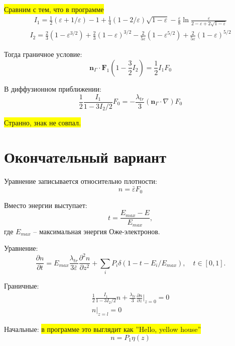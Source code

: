 \documentclass[a4paper,12pt]{article} %
\newcommand{\dff}[2]{\frac{\partial #1}{\partial #2}}
\newcommand{\dfn}[3]{\frac{\partial^#1 #2}{\partial #3^#1}}
\renewcommand{\vec}[1]{\bm{#1}}
\newcommand{\eps}{\varepsilon}
\begin{document}
\colorbox{yellow}{Сравним с тем, что в программе}
\begin{gather*}
I_1 =
\frac{1}{2} (\eps + 1/\eps) - 1 +
\frac{1}{4} (1 - 2/\eps)\sqrt{1 - \eps} -
\frac{\eps}{8} \ln \frac{\eps}{2 - \eps + 2 \sqrt{1 - \eps}}
\end{gather*}
\begin{gather*}
I_2 =
\frac{2}{3} (1 -\eps^{3/2})
+ \frac{2}{3} (1 -\eps)^{3/2}
- \frac{2}{5 \eps} (1 -\eps^{5/2})
+ \frac{2}{5 \eps} (1 -\eps)^{5/2}
\end{gather*}

Тогда граничное условие:
\begin{equation}
    \vec{n}_\Gamma \cdot \vec{F}_1 \left(1 - \frac{3}{2} I_2 \right) = \frac{1}{2} I_1 F_0
\end{equation}

В диффузионном приближении:
\begin{equation}
    \frac{1}{2} \frac{I_1}{1 - 3 I_2/2} F_0 = -\frac{\lambda_{tr}}{3}
    (\vec{n}_\Gamma \cdot \nabla) F_0
\end{equation}

\colorbox{yellow}{Странно, знак не совпал.}

\clearpage
\section{Окончательный вариант}

Уравнение записывается относительно плотности:
\begin{equation}
    n = \bar{\eps} F_0
\end{equation}

Вместо энергии выступает:
\begin{equation}
    t = \frac{E_{max} - E}{E_{max}},
\end{equation}
где $E_{max}$ -- максимальная энергия Оже-электронов.

Уравнение:
\begin{equation}
    \dff{n}{t} = E_{max}\frac{\lambda_{tr}}{3\bar{\eps}}\dfn{2}{n}{z} + \sum_{i} P_i\delta(1 - t - E_i/E_{max}), \quad t\in[0, 1].
\end{equation}

Граничные:
\begin{gather}
    \frac{1}{2} \frac{I_1}{1 - 3 I_2/2} n + \frac{\lambda_{tr}}{3} \dff{n}{z} \Bigg|_{z = 0} = 0 \\
    n\Bigg|_{z = l} = 0
\end{gather}

Начальные: \colorbox{yellow}{в программе это выглядит как ''Hello, yellow house''}
\begin{equation}
    n = P_1 \eta (z)
\end{equation}
\end{document}
